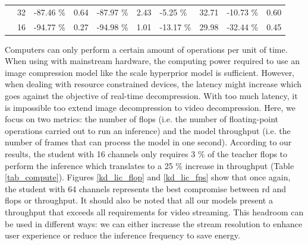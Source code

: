 \documentclass{article}
\begin{document}
\begin{table}[]
\begin{tabular}{|c|c|lr|lr|lr|lr|}
                                 & 32                                                           & {\color[HTML]{656565} -87.46 \%}                 & 0.64                                     & {\color[HTML]{656565} -87.97 \%}               & 2.43  & {\color[HTML]{656565} -5.25 \%}  & 32.71 & {\color[HTML]{656565} -10.73 \%} & 0.60 \\ \cline{2-10} 
                                 & 16                                                           & {\color[HTML]{656565} -94.77 \%}                 & 0.27                                     & {\color[HTML]{656565} -94.98 \%}               & 1.01  & {\color[HTML]{656565} -13.17 \%} & 29.98 & {\color[HTML]{656565} -32.44 \%} & 0.45 \\ \hline
    \end{tabular}
\end{table}

Computers can only perform a certain amount of operations per unit of time. When using with mainstream hardware, the computing power required to use an image compression model like the scale hyperprior model is sufficient. However, when dealing with resource constrained devices, the latency might increase which goes against the objective of real-time decompression. With too much latency, it is impossible too extend image decompression to video decompression. Here, we focus on two metrics: the number of \acrfull{flop}s (i.e. the number of floating-point operations carried out to run an inference) and the model throughput (i.e. the number of frames that can process the model in one second). According to our results, the student with 16 channels only requires 3 \% of the teacher \acrshort{flop}s to perform the inference which translates to a 25 \% increase in throughput (Table \ref{tab_compute}). Figures \ref{kd_lic_flop} and \ref{kd_lic_fps} show that once again, the student with 64 channels represents the best compromise between \acrshort{rd} and \acrshort{flop}s or throughput. It should also be noted that all our models present a throughput that exceeds all requirements for video streaming. This headroom can be used in different ways: we can either increase the stream resolution to enhance user experience or reduce the inference frequency to save energy. 
\end{document}
